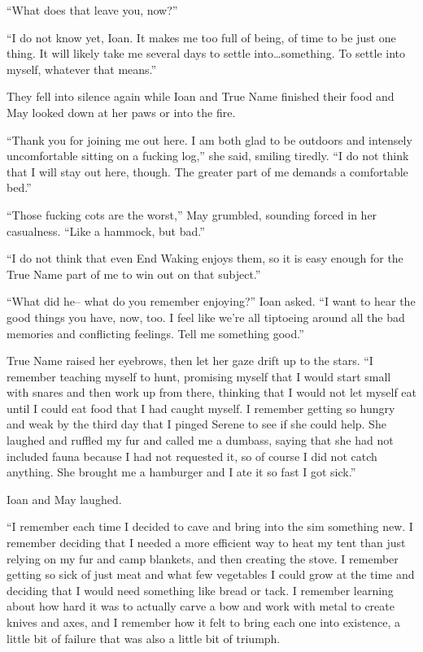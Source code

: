 ``What does that leave you, now?''

``I do not know yet, Ioan. It makes me too full of being, of time to be just one thing. It will likely take me several days to settle into\ldots something. To settle into myself, whatever that means.''

They fell into silence again while Ioan and True Name finished their food and May looked down at her paws or into the fire.

``Thank you for joining me out here. I am both glad to be outdoors and intensely uncomfortable sitting on a fucking log,'' she said, smiling tiredly. ``I do not think that I will stay out here, though. The greater part of me demands a comfortable bed.''

``Those fucking cots are the worst,'' May grumbled, sounding forced in her casualness. ``Like a hammock, but bad.''

``I do not think that even End Waking enjoys them, so it is easy enough for the True Name part of me to win out on that subject.''

``What did he-- what do you remember enjoying?'' Ioan asked. ``I want to hear the good things you have, now, too. I feel like we're all tiptoeing around all the bad memories and conflicting feelings. Tell me something good.''

True Name raised her eyebrows, then let her gaze drift up to the stars. ``I remember teaching myself to hunt, promising myself that I would start small with snares and then work up from there, thinking that I would not let myself eat until I could eat food that I had caught myself. I remember getting so hungry and weak by the third day that I pinged Serene to see if she could help. She laughed and ruffled my fur and called me a dumbass, saying that she had not included fauna because I had not requested it, so of course I did not catch anything. She brought me a hamburger and I ate it so fast I got sick.''

Ioan and May laughed.

``I remember each time I decided to cave and bring into the sim something new. I remember deciding that I needed a more efficient way to heat my tent than just relying on my fur and camp blankets, and then creating the stove. I remember getting so sick of just meat and what few vegetables I could grow at the time and deciding that I would need something like bread or tack. I remember learning about how hard it was to actually carve a bow and work with metal to create knives and axes, and I remember how it felt to bring each one into existence, a little bit of failure that was also a little bit of triumph.

